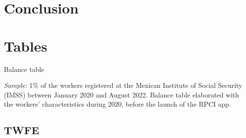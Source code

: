 \documentclass[oneside,11pt]{article}
\begin{document}
\clearpage

\section{Conclusion} \label{conclusion}



\newpage



\clearpage

%
%
%






\clearpage
\singlespacing

\section{Tables}

\begin{table}[H]
    \caption{Balance table}
    \label{balance_1}
    \begin{center}
    \scriptsize{}
    \end{center}
\end{table}

\scriptsize{
\noindent \textit{Sample:} 1\% of the workers registered at the Mexican Institute of Social Security (IMSS) between January 2020 and August 2022. Balance table elaborated with the workers' characteristics during 2020, before the launch of the RPCI app.
}

\clearpage

\subsection{TWFE}
\end{document}
